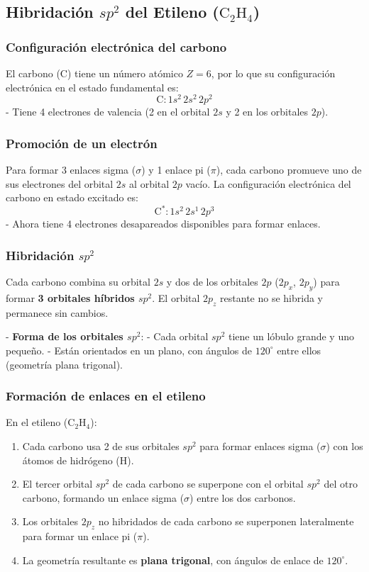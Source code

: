 \documentclass{article}
\begin{document}
\subsection{Hibridación \( sp^2 \) del Etileno (\( \text{C}_2\text{H}_4 \))}

\subsubsection{Configuración electrónica del carbono}
El carbono (C) tiene un número atómico \( Z = 6 \), por lo que su configuración electrónica en el estado fundamental es:
\[
\text{C}: 1s^2 \, 2s^2 \, 2p^2
\]
- Tiene 4 electrones de valencia (2 en el orbital \( 2s \) y 2 en los orbitales \( 2p \)).

\subsubsection{Promoción de un electrón}
Para formar 3 enlaces sigma (\( \sigma \)) y 1 enlace pi (\( \pi \)), cada carbono promueve uno de sus electrones del orbital \( 2s \) al orbital \( 2p \) vacío. La configuración electrónica del carbono en estado excitado es:
\[
\text{C}^*: 1s^2 \, 2s^1 \, 2p^3
\]
- Ahora tiene 4 electrones desapareados disponibles para formar enlaces.

\subsubsection{Hibridación \( sp^2 \)}
Cada carbono combina su orbital \( 2s \) y dos de los orbitales \( 2p \) (\( 2p_x \), \( 2p_y \)) para formar \textbf{3 orbitales híbridos \( sp^2 \)}. El orbital \( 2p_z \) restante no se hibrida y permanece sin cambios.

- \textbf{Forma de los orbitales \( sp^2 \)}:
  - Cada orbital \( sp^2 \) tiene un lóbulo grande y uno pequeño.
  - Están orientados en un plano, con ángulos de \( 120^\circ \) entre ellos (geometría plana trigonal).

\subsubsection{Formación de enlaces en el etileno}
En el etileno (\( \text{C}_2\text{H}_4 \)):
\begin{enumerate}
    \item Cada carbono usa 2 de sus orbitales \( sp^2 \) para formar enlaces sigma (\( \sigma \)) con los átomos de hidrógeno (H).
    \item El tercer orbital \( sp^2 \) de cada carbono se superpone con el orbital \( sp^2 \) del otro carbono, formando un enlace sigma (\( \sigma \)) entre los dos carbonos.
    \item Los orbitales \( 2p_z \) no hibridados de cada carbono se superponen lateralmente para formar un enlace pi (\( \pi \)).
    \item La geometría resultante es \textbf{plana trigonal}, con ángulos de enlace de \( 120^\circ \).
\end{enumerate}
\end{document}
